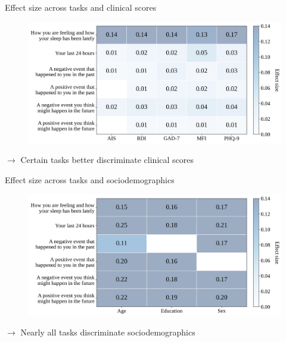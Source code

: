 \documentclass[handout,10pt]{beamer}
\begin{document}
\begin{frame}{Effect size across tasks and clinical scores}

\begin{figure}
    \centering
    \includegraphics[scale=0.35]{img/topic_modeling/heatmap_effect_sizes/V5_V6_V7_V8_V9_V10_phq9_gad7_bdi_ais_mfi_global_heatmap.png}
    \label{fig:popgen_clinical_heatmap}
\end{figure}

\pause
$\rightarrow$ Certain tasks better discriminate clinical scores

\end{frame}

\begin{frame}{Effect size across tasks and sociodemographics}

\begin{figure}
  \centering
  \includegraphics[scale=0.35]{img/topic_modeling/heatmap_effect_sizes/V5_V6_V7_V8_V9_V10_diploma_level_gender_age_global_heatmap.png}
  \label{fig:popgen_demo_heatmap}
\end{figure}

\pause

$\rightarrow$ Nearly all tasks discriminate sociodemographics

\end{frame}
\end{document}

